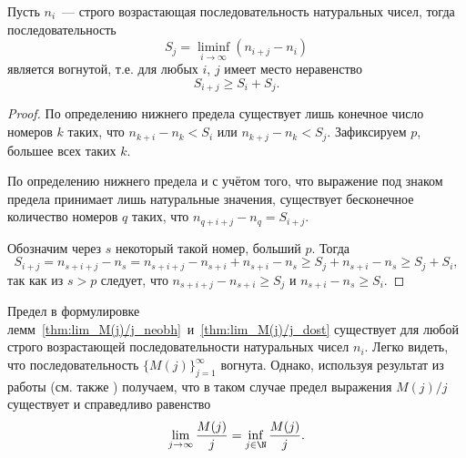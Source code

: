 \begin{lemma}
	\label{lem:convex_sequence_S_j}
	Пусть $n_i$~--- строго возрастающая последовательность натуральных чисел,
	тогда последовательность
	\begin{equation}
		S_j = \liminf_{i\to\infty} \left(n_{i+j} - n_i\right)
	\end{equation}
	является вогнутой, т.е. для любых $i$, $j$ имеет место неравенство
	\begin{equation}\label{S_j_addit}
		S_{i+j} \geq S_i + S_j
		.
	\end{equation}
\end{lemma}

\begin{proof}
	По определению нижнего предела существует лишь конечное число номеров $k$
	таких, что $n_{k+i} - n_k < S_i$ или $n_{k+j} - n_k < S_j$.
	Зафиксируем $p$, большее всех таких $k$.

	По определению нижнего предела и с учётом того, что выражение под знаком предела
	принимает лишь натуральные значения,
	существует бесконечное количество номеров $q$ таких, что $n_{q+i+j} - n_q = S_{i+j}$.

	Обозначим через $s$ некоторый такой номер, больший $p$.
	Тогда
	\begin{equation}
		S_{i+j} = n_{s+i+j} - n_s = n_{s+i+j} - n_{s+i} + n_{s+i} - n_s
		\geq S_j + n_{s+i} - n_s \geq S_j + S_i,
	\end{equation}
	так как из $s>p$ следует, что $n_{s+i+j} - n_{s+i} \geq S_j$ и $n_{s+i} - n_s \geq S_i$.
\end{proof}

	Предел в формулировке лемм~\ref{thm:lim_M(j)/j_neobh}~и~\ref{thm:lim_M(j)/j_dost}
	существует для любой строго возрастающей последовательности натуральных чисел $n_i$.
	Легко видеть, что последовательность $\{M(j)\}_{j=1}^\infty$ вогнута.
	Однако, используя результат из работы \cite{Fekete} (см. также \cite[I, Задача 98]{polia1978zadachi}) получаем,
	что в таком случае предел выражения $M(j)/j$ существует и справедливо равенство
	\begin{equation}
		\lim_{j\to\infty}\frac{M(j)}{j} =\inf_{j\in\N}\frac{M(j)}{j}
		.
	\end{equation}
